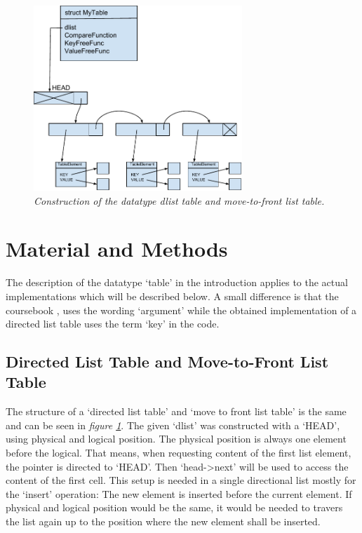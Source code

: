 \documentclass[a4paper,11pt,twoside]{article}
\begin{document}
\begin{figure}[H]
\centering
\includegraphics[width=0.7\textwidth]{figures/dlisttable.pdf}
\caption{\textit{Construction of the datatype dlist table and
    move-to-front list table.}}
\label{fig:dlisttable}
\end{figure}


\section{Material and Methods}
The description of the datatype `table' in the introduction applies to
the actual implementations which will be described below. A small
difference is that the coursebook \cite{janlert2000}, uses the wording
`argument' while the obtained implementation of a directed
list table uses the term `key' in the code.  

\subsection{Directed List Table and Move-to-Front List Table}
The structure of a `directed list table' and `move to front list table' is
the same and can be seen in \textit{figure \ref{fig:dlisttable}}. The given
`dlist' was constructed with a `HEAD', using physical and logical
position. The physical position is always one element before the logical. 
That means, when requesting content of the first list element, 
the pointer is directed to `HEAD'. Then `head->next'
will be used to access the content of the first cell. This setup is
needed in a single directional list mostly for the `insert' operation:
The new element is inserted before the current element. If physical
and logical position would be the same, it would be needed to travers
the list again up to the position where the new element shall be inserted.
\end{document}
